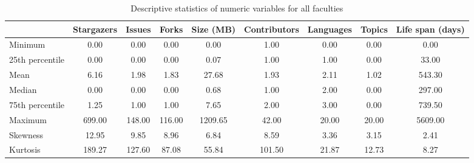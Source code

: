 
\begin{table}[h!]
\centering
\begin{adjustbox}{center}
\begin{tabular}{lcccccccc}
\toprule
{} &  Stargazers &  Issues &  Forks &  Size (MB) &  Contributors &  Languages &  Topics &  Life span (days) \\
\midrule
Minimum         &        0.00 &    0.00 &    0.00 &     0.00 &          1.00 &       0.00 &    0.00 &       0.00 \\
25th percentile &        0.00 &    0.00 &    0.00 &     0.07 &          1.00 &       1.00 &    0.00 &      33.00 \\
Mean            &        6.16 &    1.98 &    1.83 &    27.68 &          1.93 &       2.11 &    1.02 &     543.30 \\
Median          &        0.00 &    0.00 &    0.00 &     0.68 &          1.00 &       2.00 &    0.00 &     297.00 \\
75th percentile &        1.25 &    1.00 &    1.00 &     7.65 &          2.00 &       3.00 &    0.00 &     739.50 \\
Maximum         &      699.00 &  148.00 &  116.00 &  1209.65 &         42.00 &      20.00 &   20.00 &    5609.00 \\
Skewness        &       12.95 &    9.85 &    8.96 &     6.84 &          8.59 &       3.36 &    3.15 &       2.41 \\
Kurtosis        &      189.27 &  127.60 &   87.08 &    55.84 &        101.50 &      21.87 &   12.73 &       8.27 \\
\bottomrule
\end{tabular}
\end{adjustbox}
\caption{Descriptive statistics of numeric variables for all faculties}
\label{tab:all_faculties}
\end{table}
